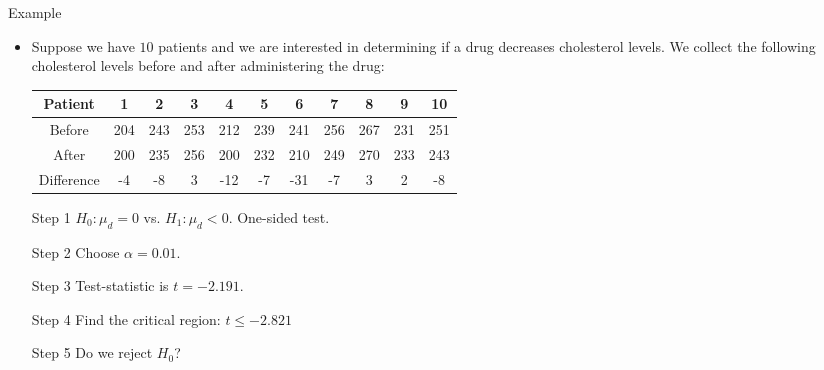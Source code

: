 \documentclass[10pt, xcolor=table]{beamer}
\begin{document}
\begin{frame}{Example}
\begin{itemize}
\setlength{\itemsep}{12pt}
\item Suppose we have $10$ patients and we are interested in determining if a drug decreases cholesterol levels. We collect the following cholesterol levels before and after administering the drug:
{\scriptsize 
\begin{table}[]
\begin{tabular}{|c|c|c|c|c|c|c|c|c|c|c|}
\hline
Patient    & 1   & 2   & 3   & 4   & 5   & 6   & 7   & 8   & 9   & 10  \\ \hline
Before     & 204 & 243 & 253 & 212 & 239 & 241 & 256 & 267 & 231 & 251 \\ \hline
After      & 200 & 235 & 256 & 200 & 232 & 210 & 249 & 270 & 233 & 243 \\ \hline
Difference & -4  & -8  & 3   & -12 & -7  & -31 & -7  & 3   & 2   & -8  \\ \hline
\end{tabular}
\end{table}
}
\item[Step 1] $H_0: \mu_d = 0$ vs. $H_1: \mu_d < 0$. One-sided test.       
\item[Step 2] Choose $\alpha = 0.01$. 
\item[Step 3] Test-statistic is $t = -2.191$.
\item[Step 4] Find the critical region: $t \leq -2.821$
\item[Step 5] Do we reject $H_0$? 
\end{itemize}
\end{frame}
\end{document}
